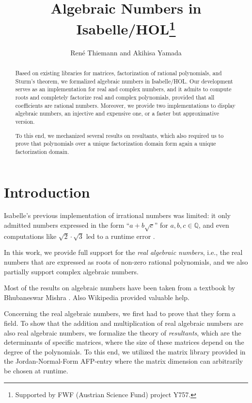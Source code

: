 \documentclass[11pt,a4paper]{article}
\newcommand\rats{\mathbb{Q}}
\newcommand\rais{real algebraic numbers\xspace}
\begin{document}
\title{Algebraic Numbers in Isabelle/HOL\footnote{Supported by FWF (Austrian Science Fund) project Y757.}}
\author{Ren\'e Thiemann and Akihisa Yamada}
\maketitle

\begin{abstract}
Based on existing libraries for matrices, factorization of rational polynomials, 
and Sturm's theorem,
we formalized algebraic numbers in Isabelle/HOL. Our development serves
as an implementation for real and complex numbers, and it admits to compute roots
and completely factorize real and complex polynomials, provided that all
coefficients are rational numbers. Moreover, we provide two implementations to display
algebraic numbers, an injective and expensive one, or a faster but approximative version.

To this end, we mechanized several results on resultants,
which also required us to prove that polynomials over a unique factorization domain form 
again a unique factorization domain. 
\end{abstract}

\tableofcontents

\section{Introduction}

Isabelle's previous implementation of irrational numbers was limited:
it only admitted numbers expressed in the form ``$a+b\sqrt{c}$'' for $a,b,c \in \rats$,
and even computations like $\sqrt2 \cdot \sqrt3$ led to a runtime error \cite{Real-AFP}.

In this work, we provide full support for the \emph{real algebraic numbers},
i.e., the real numbers that are expressed as roots of non-zero rational polynomials,
and we also partially support complex algebraic numbers.

Most of the results on algebraic numbers have been taken from a textbook 
by Bhubaneswar Mishra \cite{AlgNumbers}.
Also Wikipedia provided valuable help.

\medskip
Concerning the real algebraic numbers, we first had to prove that they form a field.
To show that the addition and multiplication of \rais are also \rais,
we formalize the theory of \emph{resultants}, which are the determinants of 
specific matrices, where the size of these matrices depend on the degree of the 
polynomials. To this end, we utilized the matrix library provided in the Jordan-Normal-Form
AFP-entry \cite{JNF-AFP} where the matrix dimension can arbitrarily be chosen at runtime.
\end{document}
